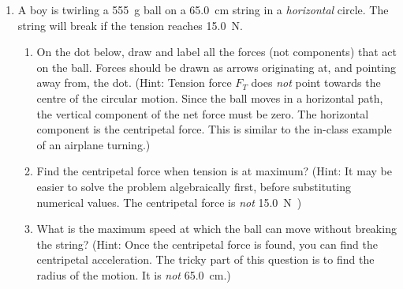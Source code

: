 \begin{enumerate}[itemsep=6pt]
\item A boy is twirling a \SI{555}{\gram} ball on a \SI{65.0}{\centi\metre}
  string in a \emph{horizontal} circle. The string will break if the tension
  reaches \SI{15.0}\newton.
  \begin{enumerate}[itemsep=3pt]
  \item On the dot below, draw and label all the forces (not components) that
    act on the ball. Forces should be drawn as arrows originating at, and
    pointing away from, the dot. (Hint: Tension force $F_T$ does \emph{not}
    point towards the centre of the circular motion. Since the ball moves in a
    horizontal path, the vertical component of the net force must be zero.
    The horizontal component is the centripetal force. This is similar to the
    in-class example of an airplane turning.)

  \item Find the centripetal force when tension is at maximum? (Hint: It may be
    easier to solve the problem algebraically first, before substituting
    numerical values. The centripetal force is \emph{not} \SI{15.0}\newton.)
    
  \item What is the maximum speed at which the ball can move without breaking
    the string? (Hint: Once the centripetal force is found, you can find the
    centripetal acceleration. The tricky part of this question is to find the
    radius of the motion. It is  \emph{not} \SI{65.0}{\centi\metre}.)
  \end{enumerate}


\end{enumerate}
